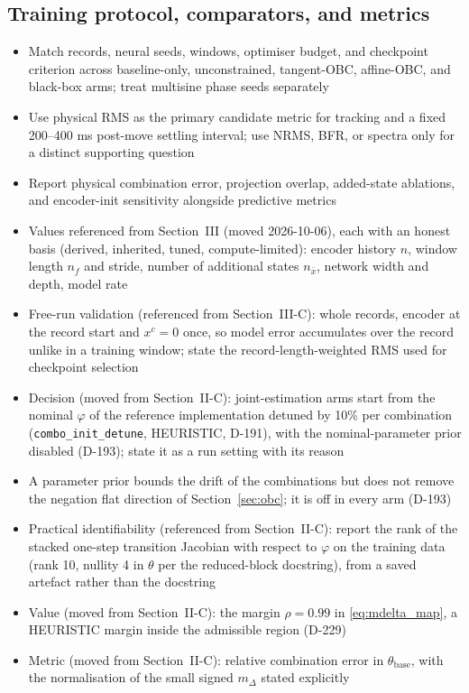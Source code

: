 \subsection{Training protocol, comparators, and metrics}
\begin{itemize}
\item Match records, neural seeds, windows, optimiser budget, and checkpoint criterion across baseline-only, unconstrained, tangent-OBC, affine-OBC, and black-box arms; treat multisine phase seeds separately
\item Use physical RMS as the primary candidate metric for tracking and a fixed 200--400 ms post-move settling interval; use NRMS, BFR, or spectra only for a distinct supporting question
\item Report physical combination error, projection overlap, added-state ablations, and encoder-init sensitivity alongside predictive metrics
\item Values referenced from Section~III (moved 2026-10-06), each with an honest basis (derived, inherited, tuned, compute-limited): encoder history $n$, window length $n_f$ and stride, number of additional states $n_{\bar x}$, network width and depth, model rate
\item Free-run validation (referenced from Section~III-C): whole records, encoder at the record start and $x^c=0$ once, so model error accumulates over the record unlike in a training window; state the record-length-weighted RMS used for checkpoint selection
\item Decision (moved from Section~II-C): joint-estimation arms start from the nominal $\varphi$ of the reference implementation detuned by 10\% per combination (\texttt{combo\_init\_detune}, HEURISTIC, D-191), with the nominal-parameter prior disabled (D-193); state it as a run setting with its reason
\item A parameter prior bounds the drift of the combinations but does not remove the negation flat direction of Section~\ref{sec:obc}; it is off in every arm (D-193)
\item Practical identifiability (referenced from Section~II-C): report the rank of the stacked one-step transition Jacobian with respect to $\varphi$ on the training data (rank 10, nullity 4 in $\theta$ per the reduced-block docstring), from a saved artefact rather than the docstring
\item Value (moved from Section~II-C): the margin $\rho=0.99$ in \eqref{eq:mdelta_map}, a HEURISTIC margin inside the admissible region (D-229)
\item Metric (moved from Section~II-C): relative combination error in $\theta_{\mathrm{base}}$, with the normalisation of the small signed $m_\Delta$ stated explicitly

\end{itemize}
